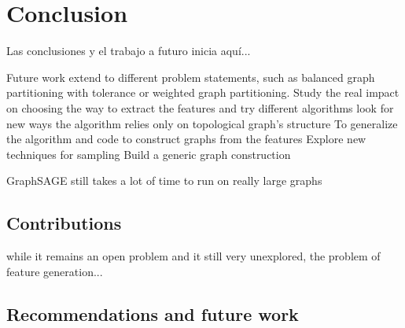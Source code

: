 
\chapter{Conclusion}

Las conclusiones y el trabajo a futuro inicia aqu\'i...

Future work
extend to different problem statements, such as balanced graph partitioning with tolerance or weighted graph partitioning.
Study the real impact on choosing the way to extract the features and try different algorithms
look for new ways the algorithm relies only on topological graph's structure
To generalize the algorithm and code to construct graphs from the features
Explore new techniques for sampling
Build a generic graph construction

GraphSAGE still takes a lot of time to run on really large graphs

\section{Contributions}
while it remains an open problem and it still very unexplored, the problem of feature generation...
\section{Recommendations and future work}

\clearpage